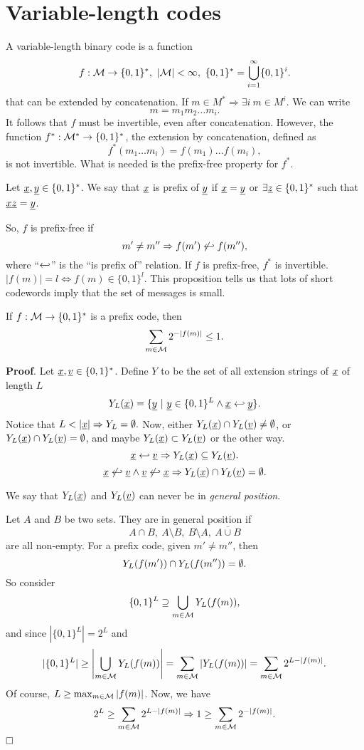 \chapter{Variable-length codes}

A variable-length binary code is a function 
\[f:\mathcal{M} \rightarrow \{0, 1\}^*,\ |\mathcal{M}| < \infty,\ \{0, 1\}^* = \bigcup_{i = 1}^\infty \{0, 1\}^i.
\]
that can be extended by concatenation. If $m \in M^* \Rightarrow \exists i\ m \in M^i$. We can write $$m = m_1m_2\ldots m_i.$$ It follows that $f$ must be invertible, even after concatenation. However, the function $f^*:\mathcal{M}^* \rightarrow \{0, 1\}^*$, the extension by concatenation, defined as $$f^*(m_1\ldots m_i) = f(m_1)\ldots f(m_i),$$ is not invertible. What is needed is the prefix-free property for $f^*$.

Let $\underline{x}, \underline{y} \in \{0, 1\}^*$. We say that $\underline{x}$ is prefix of $\underline{y}$ if $\underline{x} = \underline{y}$ or $\exists \underline{z} \in \{0, 1\}^*$ such that $\underline{x}\underline{z} = \underline{y}$.

 So, $f$ is prefix-free if $$m'\not=m'' \Rightarrow f(m') \not\hookleftarrow f(m''),$$ where ``$\hookleftarrow$'' is the ``is prefix of'' relation. If $f$ is prefix-free, $f^*$ is invertible. $|f(m)| = l \Leftrightarrow f(m) \in \{0, 1\}^l$. This proposition tells us that lots of short codewords imply that the set of messages is small.

\begin{prop}\label{prop:kraft}
	If $f:\mathcal{M} \rightarrow \{0, 1\}^*$ is a prefix code, then $$\sum_{m\in\mathcal{M}}2^{-|f(m)|}\leq 1.$$
\end{prop}

\noindent\textbf{Proof}. Let $\underline{x}, \underline{v} \in \{0, 1\}^*$. Define $Y$ to be the set of all extension strings of $\underline{x}$ of length $L$
$$Y_L(\underline{x}) = \{\underline{y}\ |\ \underline{y} \in \{0, 1\}^L \wedge \underline{x} \hookleftarrow \underline{y} \}.$$
Notice that $L < |\underline{x}| \Rightarrow Y_L = \emptyset.$ Now, either $Y_L(\underline{x}) \cap Y_L(\underline{v}) \not= \emptyset$, or $Y_L(\underline{x}) \cap Y_L(\underline{v}) = \emptyset$, and maybe $Y_L(\underline{x}) \subset Y_L(\underline{v})$ or the other way. 
$$\underline{x} \hookleftarrow \underline{v} \Rightarrow Y_L(\underline{x}) \subseteq Y_L(\underline{v}).$$
$$\underline{x} \not\hookleftarrow \underline{v} \wedge \underline{v} \not\hookleftarrow \underline{x} \Rightarrow Y_L(\underline{x}) \cap Y_L(\underline{v}) = \emptyset.$$

We say that $Y_L(\underline{x})$ and $Y_L(\underline{v})$ can never be in \emph{general position}.

 Let $A$ and  $B$ be two sets. They are in general position if $$A\cap B,\ A \setminus B,\ B \setminus A,\ \overline{A\cup B}$$ are all non-empty. For a prefix code, given $m'\not= m''$, then $$Y_L(f(m')) \cap Y_L(f(m'')) = \emptyset.$$ So consider $$\{0, 1\}^L \supseteq \bigcup_{m \in\mathcal{M}}Y_L(f(m)),$$ and since $|\{0, 1\}^L| = 2^L$ and $$|\{0, 1\}^L| \geq \left|\bigcup_{m\in\mathcal{M}}Y_L(f(m))\right| = \sum_{m\in\mathcal{M}} |Y_L(f(m))| = \sum_{m \in \mathcal{M}} 2^{L - |f(m)|}.$$ Of course, $L \geq \max_{m \in \mathcal{M}} |f(m)|$. Now, we have
$$2^L \geq \sum_{m\in\mathcal{M}}2^{L - |f(m)|} \Rightarrow 1 \geq \sum_{m\in\mathcal{M}} 2^{-|f(m)|}.$$
$\hfill\Box$

